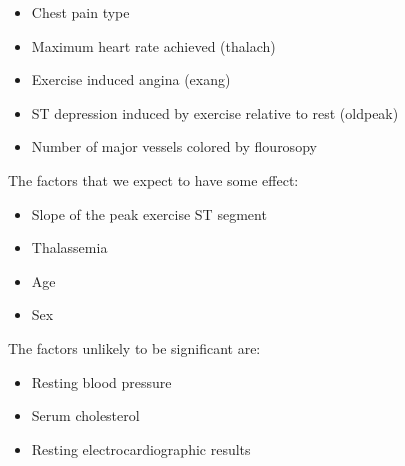 \documentclass[letter]{article}
\begin{document}
\begin{itemize}
	\item Chest pain type
	\item Maximum heart rate achieved (thalach)
	\item Exercise induced angina (exang)
	\item ST depression induced by exercise relative to rest (oldpeak)
	\item Number of major vessels colored by flourosopy
\end{itemize}
The factors that we expect to have some effect:
\begin{itemize}
	\item Slope of the peak exercise ST segment
	\item Thalassemia
	\item Age
	\item Sex
\end{itemize}
The factors unlikely to be significant are:
\begin{itemize}
	\item Resting blood pressure
	\item Serum cholesterol
	\item Resting electrocardiographic results
\end{itemize}
\end{document}
